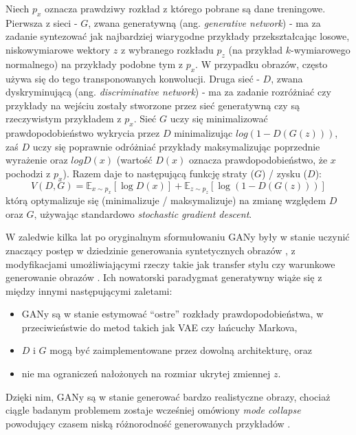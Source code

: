 \documentclass[magisterska]{pracamgr}
\renewcommand{\cite}{\citep}
\begin{document}
Niech $p_x$ oznacza prawdziwy rozkład z którego pobrane są dane treningowe. Pierwsza z sieci - $G$, zwana generatywną (ang. \textit{generative network}) - ma za zadanie syntezować jak najbardziej wiarygodne przykłady przekształcając losowe, niskowymiarowe wektory $z$ z wybranego rozkładu $p_z$ (na przykład $k$-wymiarowego normalnego) na przykłady podobne tym z $p_x$. W przypadku obrazów, często używa się do tego transponowanych konwolucji. Druga sieć - $D$, zwana dyskryminującą (ang. \textit{discriminative network}) - ma za zadanie rozróżniać czy przykłady na wejściu zostały stworzone przez sieć generatywną czy są rzeczywistym przykładem z $p_x$. Sieć $G$ uczy się minimalizować prawdopodobieństwo wykrycia przez $D$ minimalizując $log(1 - D(G(z)))$, zaś $D$ uczy się poprawnie odróżniać przykłady maksymalizując poprzednie wyrażenie oraz $log D(x)$ (wartość $D(x)$ oznacza prawdopodobieństwo, że $x$ pochodzi z $p_x$). Razem daje to następującą funkcję straty ($G$) / zysku ($D$):
\begin{equation}
    V(D, G) = \mathbb{E}_{x \sim p_x}[\log D(x)] + \mathbb{E}_{z \sim p_z}[\log(1 - D(G(z)))]
\end{equation}
którą optymalizuje się (minimalizuje / maksymalizuje) na zmianę względem $D$ oraz $G$, używając standardowo \textit{stochastic gradient descent}.

W zaledwie kilka lat po oryginalnym sformułowaniu GANy były w stanie uczynić znaczący postęp w dziedzinie generowania syntetycznych obrazów \cite{karras2019stylegan} \cite{karras2020stylegan2}, z modyfikacjami umożliwiającymi rzeczy takie jak transfer stylu \cite{abdal2019image2stylegan} czy warunkowe generowanie obrazów \cite{zhu2020cyclegan}. Ich nowatorski paradygmat generatywny wiąże się z między innymi następującymi zaletami:
\begin{itemize}
    \setlength\itemsep{0em}
    \item GANy są w stanie estymować "`ostre"' rozkłady prawdopodobieństwa, w przeciwieństwie do metod takich jak VAE czy łańcuchy Markova,
    \item $D$ i $G$ mogą być zaimplementowane przez dowolną architekturę, oraz
    \item nie ma ograniczeń nałożonych na rozmiar ukrytej zmiennej $z$.
\end{itemize}
Dzięki nim, GANy są w stanie generować bardzo realistyczne obrazy, chociaż ciągle badanym problemem zostaje wcześniej omówiony \textit{mode collapse} powodujący czasem niską różnorodność generowanych przykładów \cite{wang2020gansurvey}.
\end{document}
